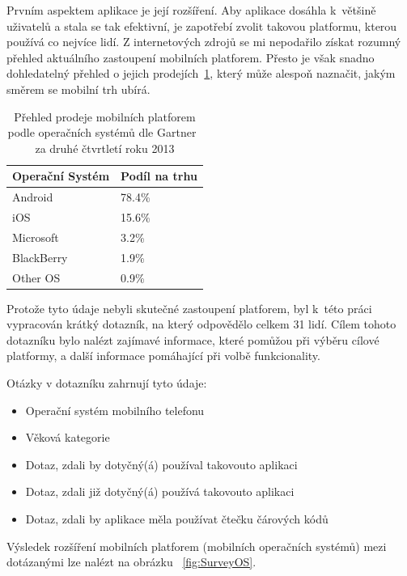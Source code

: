 \documentclass[thesis=B,czech]{FITthesis}[2013/10/20]
\begin{document}
Prvním aspektem aplikace je její rozšíření. Aby aplikace dosáhla k~většině uživatelů a stala se tak efektivní, je zapotřebí zvolit takovou platformu, kterou používá co nejvíce lidí. Z internetových zdrojů se mi nepodařilo získat rozumný přehled aktuálního zastoupení mobilních platforem. Přesto je však snadno dohledatelný přehled o jejich prodejích~\ref{table:MobilePlatf}, který může alespoň naznačit, jakým směrem se mobilní trh ubírá.

\begin{table}[H]
    \begin{tabular}{|l|l|}
    \hline
    Operační Systém & Podíl na trhu \\ \hline
    Android         & 78.4\%        \\ \hline
    iOS             & 15.6\%        \\ \hline
    Microsoft       & 3.2\%         \\ \hline
    BlackBerry      & 1.9\%         \\ \hline
    Other OS        & 0.9\%         \\ \hline
    \end{tabular}
    \caption{Přehled prodeje mobilních platforem podle operačních systémů dle Gartner~\cite{gartner} za druhé čtvrtletí roku 2013}
    \label{table:MobilePlatf}
\end{table}

Protože tyto údaje nebyli skutečné zastoupení platforem, byl k~této práci vypracován krátký dotazník, na který odpovědělo celkem 31 lidí. Cílem tohoto dotazníku bylo nalézt zajímavé informace, které pomůžou při výběru cílové platformy, a další informace pomáhající při volbě funkcionality.

Otázky v dotazníku zahrnují tyto údaje:
\begin{itemize}
	\item Operační systém mobilního telefonu
	\item Věková kategorie
	\item Dotaz, zdali by dotyčný(á) používal takovouto aplikaci
	\item Dotaz, zdali již dotyčný(á) používá takovouto aplikaci
	\item Dotaz, zdali by aplikace měla používat čtečku čárových kódů
\end{itemize}

Výsledek rozšíření mobilních platforem (mobilních operačních systémů) mezi dotázanými lze nalézt na obrázku ~\ref{fig:SurveyOS}.
\end{document}
